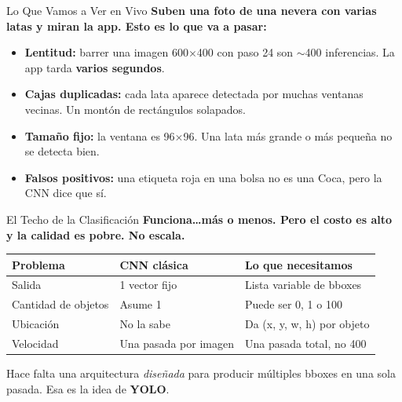 \documentclass[aspectratio=169, 11pt]{beamer}
\begin{document}
\begin{frame}[shrink]{Lo Que Vamos a Ver en Vivo}
  \vspace{6pt}
  {\footnotesize\color{arcaDark}\bfseries
    Suben una foto de una nevera con varias latas y miran la app.
    Esto es lo que va a pasar:}

  \vspace{10pt}
  {\footnotesize
  \begin{itemize}\setlength{\itemsep}{6pt}
    \item[{\color{arcaRed}\scriptsize\faClock}]
      \textbf{Lentitud:} barrer una imagen 600$\times$400 con paso 24
      son $\sim$400 inferencias. La app tarda \textbf{varios segundos}.
    \item[{\color{arcaRed}\scriptsize\faCopy}]
      \textbf{Cajas duplicadas:} cada lata aparece detectada por
      muchas ventanas vecinas. Un mont\'on de rect\'angulos solapados.
    \item[{\color{arcaRed}\scriptsize\faRulerCombined}]
      \textbf{Tama\~no fijo:} la ventana es 96$\times$96. Una lata m\'as
      grande o m\'as peque\~na no se detecta bien.
    \item[{\color{arcaRed}\scriptsize\faQuestionCircle}]
      \textbf{Falsos positivos:} una etiqueta roja en una bolsa no es
      una Coca, pero la CNN dice que s\'i.
  \end{itemize}
  }
\end{frame}

\begin{frame}[shrink]{El Techo de la Clasificaci\'on}
  \vspace{6pt}
  {\footnotesize\color{arcaDark}\bfseries
    Funciona\ldots m\'as o menos. Pero el costo es alto y la calidad
    es pobre. \textbf{No escala}.}

  \vspace{14pt}
  {\footnotesize
  \begin{tabular}{@{}p{4.0cm} p{4.0cm} p{4.0cm}@{}}
    \toprule
    \textbf{Problema} & \textbf{CNN cl\'asica} & \textbf{Lo que necesitamos} \\
    \midrule
    \rowcolor{arcaGray}
    Salida
    & 1 vector fijo
    & Lista variable de bboxes \\
    Cantidad de objetos
    & Asume 1
    & Puede ser 0, 1 o 100 \\
    \rowcolor{arcaGray}
    Ubicaci\'on
    & No la sabe
    & Da (x, y, w, h) por objeto \\
    Velocidad
    & Una pasada por imagen
    & Una pasada total, no 400 \\
    \bottomrule
  \end{tabular}
  }

  \vspace{14pt}
  \begin{tcolorbox}[colback=arcaRed!8, colframe=arcaRed, boxrule=0.5pt,
    arc=2pt, left=6pt, right=6pt, top=4pt, bottom=4pt]
    {\scriptsize\color{arcaDark}
    \faExclamationTriangle\hspace{4pt} Hace falta una arquitectura
    \emph{dise\~nada} para producir m\'ultiples bboxes en una sola
    pasada. Esa es la idea de \textbf{YOLO}.}
  \end{tcolorbox}
\end{frame}
\end{document}
